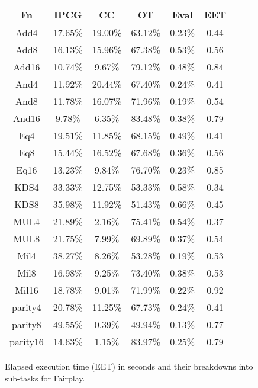 \begin{figure}
\begin{center}
\begin{tabular}{|c|c|c|c|c|c|} \hline
Fn & IPCG &     CC &     OT &     Eval &     EET \\ \hline

Add4 & 17.65\% & 19.00\% & 63.12\% & 0.23\% & 0.44 \\ \hline
Add8 & 16.13\% & 15.96\% & 67.38\% & 0.53\% & 0.56 \\ \hline
Add16 & 10.74\% & 9.67\% & 79.12\% & 0.48\% & 0.84 \\ \hline
And4 & 11.92\% & 20.44\% & 67.40\% & 0.24\% & 0.41 \\ \hline
And8 & 11.78\% & 16.07\% & 71.96\% & 0.19\% & 0.54 \\ \hline
And16 & 9.78\% & 6.35\% & 83.48\% & 0.38\% & 0.79 \\ \hline
Eq4 & 19.51\% & 11.85\% & 68.15\% & 0.49\% & 0.41 \\ \hline
Eq8 & 15.44\% & 16.52\% & 67.68\% & 0.36\% & 0.56 \\ \hline
Eq16 & 13.23\% & 9.84\% & 76.70\% & 0.23\% & 0.85 \\ \hline
KDS4 & 33.33\% & 12.75\% & 53.33\% & 0.58\% & 0.34 \\ \hline
KDS8 & 35.98\% & 11.92\% & 51.43\% & 0.66\% & 0.45 \\ \hline
MUL4 & 21.89\% & 2.16\% & 75.41\% & 0.54\% & 0.37 \\ \hline
MUL8 & 21.75\% & 7.99\% & 69.89\% & 0.37\% & 0.54 \\ \hline
Mil4 & 38.27\% & 8.26\% & 53.28\% & 0.19\% & 0.53 \\ \hline
Mil8 & 16.98\% & 9.25\% & 73.40\% & 0.38\% & 0.53 \\ \hline
Mil16 & 18.78\% & 9.01\% & 71.99\% & 0.22\% & 0.92 \\ \hline
parity4 & 20.78\% & 11.25\% & 67.73\% & 0.24\% & 0.41 \\ \hline
parity8 & 49.55\% & 0.39\% & 49.94\% & 0.13\% & 0.77 \\ \hline
parity16 & 14.63\% & 1.15\% & 83.97\% & 0.25\% & 0.79 \\ \hline


\end{tabular}
\end{center}
\caption{Elapsed execution time (EET) in seconds and their breakdowns into sub-tasks for
Fairplay.}
\label{fig:Fairplay-timing}
\end{figure}


